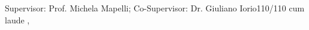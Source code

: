\begin{experiences}
{    Supervisor: Prof. Michela Mapelli; Co-Supervisor: Dr. Giuliano Iorio}{110/110 cum laude}
   {,}
  \emptySeparator
\end{experiences}
